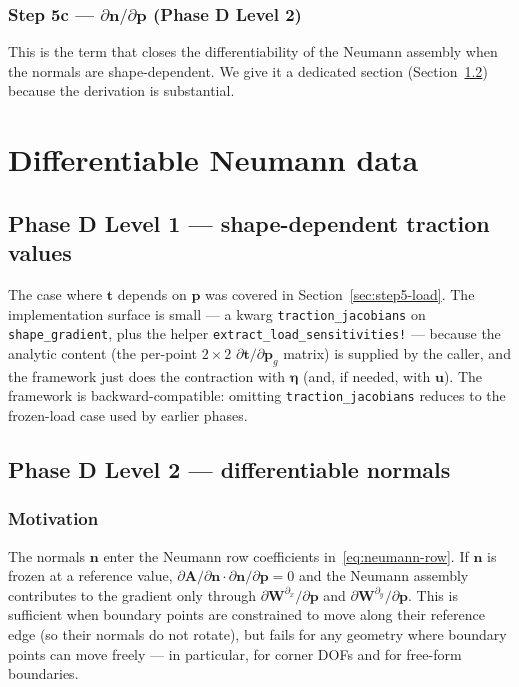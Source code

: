 \documentclass[11pt,a4paper]{article}
\newcommand{\mat}[1]{\mathbf{#1}}
\newcommand{\vect}[1]{\boldsymbol{#1}}
\newcommand{\pts}{\vect{p}}
\begin{document}
\subsubsection{Step 5c --- \texorpdfstring{$\partial\vect n/\partial\pts$}{dn/dp}
(Phase D Level 2)}
\label{sec:step5-normals}

This is the term that closes the differentiability of the
Neumann assembly when the normals are shape-dependent. We give
it a dedicated section (Section~\ref{sec:l2}) because the
derivation is substantial.

\section{Differentiable Neumann data}
\label{sec:boundary-diff}

\subsection{Phase D Level 1 --- shape-dependent traction values}

The case where $\vect t$ depends on $\pts$ was covered in
Section~\ref{sec:step5-load}. The implementation surface is small ---
a kwarg \texttt{traction\_jacobians} on \texttt{shape\_gradient},
plus the helper \texttt{extract\_load\_sensitivities!} ---
because the analytic content (the per-point $2\times 2$
$\partial\vect t/\partial\pts_g$ matrix) is supplied by the
caller, and the framework just does the contraction with
$\vect\eta$ (and, if needed, with $\vect u$). The framework is
backward-compatible: omitting \texttt{traction\_jacobians} reduces
to the frozen-load case used by earlier phases.

\subsection{Phase D Level 2 --- differentiable normals}
\label{sec:l2}

\subsubsection{Motivation}

The normals $\vect n$ enter the Neumann row coefficients
in~\eqref{eq:neumann-row}. If $\vect n$ is frozen at a reference
value, $\partial\mat A/\partial\vect n \cdot \partial\vect n/\partial\pts
= 0$ and the Neumann assembly contributes to the gradient only
through $\partial\mat W^{\partial_x}/\partial\pts$ and
$\partial\mat W^{\partial_y}/\partial\pts$. This is sufficient
when boundary points are constrained to move along their reference
edge (so their normals do not rotate), but fails for any geometry
where boundary points can move freely --- in particular, for
corner DOFs and for free-form boundaries.
\end{document}
